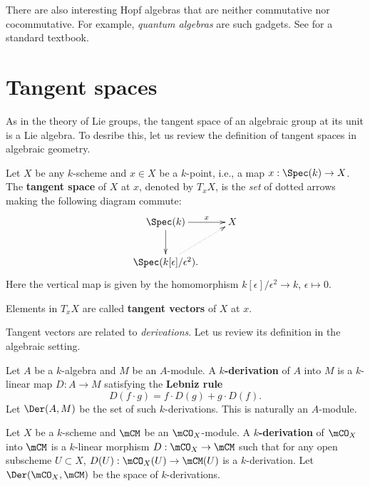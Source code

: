 \begin{rem}
	There are also interesting Hopf algebras that are neither commutative nor cocommutative. For example, \emph{quantum algebras} are such gadgets. See \cite{L} for a standard textbook.
\end{rem}


\section{Tangent spaces}

	As in the theory of Lie groups, the tangent space of an algebraic group at its unit is a Lie algebra. To desribe this, let us review the definition of tangent spaces in algebraic geometry.

\begin{defn}
	Let $X$ be any $k$-scheme and $x\in X$ be a $k$-point, i.e., a map $x: \Spec(k) \to X$. The \textbf{tangent space} of $X$ at $x$, denoted by $T_xX$, is the \emph{set} of dotted arrows making the following diagram commute:
	\[
		\xymatrix{
			\Spec(k) \ar[r]^-x \ar[d]
			& X \\
			\Spec(k[\epsilon]/\epsilon^2). \ar@{.>}[ru]
		}
	\]
	Here the vertical map is given by the homomorphism $k[\epsilon]/\epsilon^2 \to k$, $\epsilon\mapsto 0$.

	Elements in $T_xX$ are called \textbf{tangent vectors} of $X$ at $x$.
\end{defn}


	Tangent vectors are related to \emph{derivations}. Let us review its definition in the algebraic setting.

\begin{defn}
	Let $A$ be a $k$-algebra and $M$ be an $A$-module. A \textbf{$k$-derivation} of $A$ into $M$ is a $k$-linear map $D:A\to M$ satisfying the \textbf{Lebniz rule}
	\[
		D(f\cdot g) = f\cdot D (g) + g\cdot D (f).
	\]
	Let $\Der(A,M)$ be the set of such $k$-derivations. This is naturally an $A$-module.
\end{defn}

\begin{defn}
	Let $X$ be a $k$-scheme and $\mCM$ be an $\mCO_X$-module. A \textbf{$k$-derivation} of $\mCO_X$ into $\mCM$ is a $k$-linear morphism $D:\mCO_X \to \mCM$ such that for any open subscheme $U\subset X$, $D(U): \mCO_X(U) \to \mCM(U)$ is a $k$-derivation. Let $\Der(\mCO_X,\mCM)$ be the space of $k$-derivations.

\end{defn}

